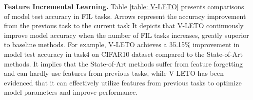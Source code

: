 \noindent\textbf{Feature Incremental Learning.}
Table \ref{table: V-LETO} presents comparisons of model test accuracy in FIL tasks. 
Arrows represent the accuracy improvement from the previous task to the current task
It depicts that V-LETO continuously improve model accuracy when the number of FIL tasks increases, greatly superior to baseline methods. 
For example, V-LETO achieves a 35.15\% improvement in model test accuracy in task4 on CIFAR10 dataset compared to the State-of-Art methods.
It implies that the State-of-Art methods suffer from feature forgetting and can hardly use features from previous tasks, while V-LETO has been evidenced that it can effectively utilize features from previous tasks to optimize model parameters and improve performance.







